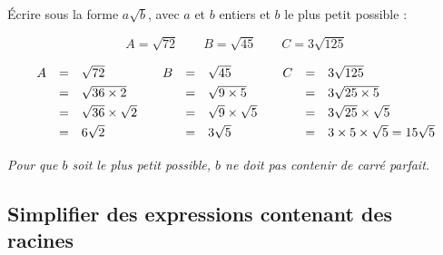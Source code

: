 \begin{methode}
	Écrire sous la forme $a\sqrt{b}$, avec $a$ et $b$ entiers et $b$ le plus petit possible :

	\[
		A = \sqrt{72} \qquad B = \sqrt{45} \qquad C = 3\sqrt{125}
	\]

	\begin{correction}

		\[
			\begin{array}{lll}
				\def\arraystretch{1.3}%
				\begin{array}{rcl}
					A & = & \sqrt{72}                 \\
					  & = & \sqrt{36 \times 2}        \\
					  & = & \sqrt{36} \times \sqrt{2} \\
					  & = & 6\sqrt{2}                 \\
				\end{array}%
				 & %
				\def\arraystretch{1.3}%
				\begin{array}{rcl}
					B & = & \sqrt{45}                \\
					  & = & \sqrt{9 \times 5}        \\
					  & = & \sqrt{9} \times \sqrt{5} \\
					  & = & 3\sqrt{5}                \\
				\end{array} %
				 & %
				\def\arraystretch{1.3}%
				\begin{array}{rcl}
					C & = & 3\sqrt{125}                             \\
					  & = & 3\sqrt{25 \times 5}                     \\
					  & = & 3\sqrt{25} \times \sqrt{5}              \\
					  & = & 3 \times 5 \times \sqrt{5} = 15\sqrt{5} \\
				\end{array}
			\end{array}
		\]

		\textit{Pour que $b$ soit le plus petit possible, $b$ ne doit pas contenir de carré parfait.}
	\end{correction}
\end{methode}

\subsection{Simplifier des expressions contenant des racines}

